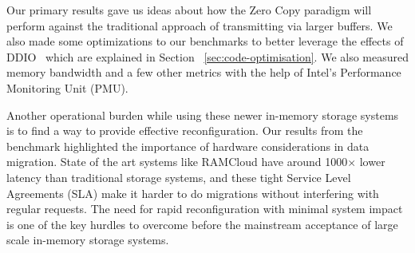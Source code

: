 Our primary results gave us ideas about how the Zero Copy paradigm will perform against
the traditional approach of transmitting via larger buffers. We also made some optimizations to our 
benchmarks to better leverage the effects of DDIO~\cite{ddio} which are explained in Section ~\ref{sec:code-optimisation}. 
We also measured memory bandwidth and a few other metrics with the help of Intel\textregistered's Performance Monitoring Unit (PMU).

Another operational burden while using these newer in-memory storage systems is to find a way to 
provide effective reconfiguration. Our results from the benchmark \linebreak highlighted the importance of 
hardware considerations in data migration. State of the art systems like RAMCloud have around 1000$\times$
lower latency than traditional storage systems, and these tight Service Level Agreements (SLA) make it harder to do migrations
without interfering with regular requests. The need for rapid reconfiguration with minimal system 
impact is one of the key hurdles to overcome before the mainstream acceptance of large scale 
in-memory storage systems.

